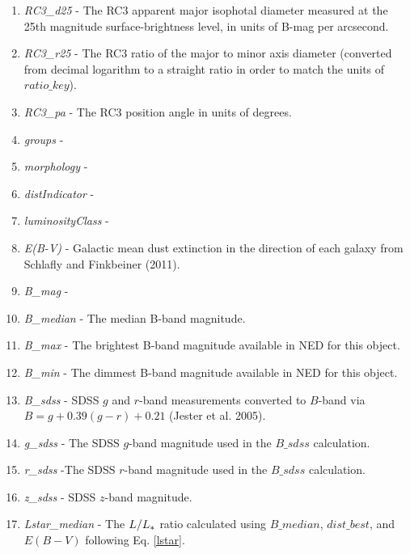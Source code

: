 \documentclass[iop]{emulateapj-rtx4}
\begin{document}
\begin{enumerate}
\item \textit{RC3\_d25} - The RC3 apparent major isophotal diameter measured at the 25th magnitude surface-brightness level, in units of B-mag per arcsecond.

\item \textit{RC3\_r25} - The RC3 ratio of the major to minor axis diameter (converted from decimal logarithm to a straight ratio in order to match the units of $ratio\_key$). 

\item \textit{RC3\_pa} - The RC3 position angle in units of degrees.

\item \textit{groups} - 

\item \textit{morphology} - 

\item \textit{distIndicator} - 

\item \textit{luminosityClass} - 

\item \textit{E(B-V)} - Galactic mean dust extinction in the direction of each galaxy from Schlafly and Finkbeiner (2011).

\item \textit{B\_mag} - 

\item \textit{B\_median} - The median B-band magnitude.

\item \textit{B\_max} - The brightest B-band magnitude available in NED for this object.

\item \textit{B\_min} - The dimmest B-band magnitude available in NED for this object.

\item \textit{B\_sdss} - SDSS $g$ and $r$-band measurements converted to $B$-band via $B = g + 0.39 (g-r) + 0.21$ (Jester et al. 2005).

\item \textit{g\_sdss} - The SDSS $g$-band magnitude used in the $B\_sdss$ calculation.

\item \textit{r\_sdss} -The SDSS $r$-band magnitude used in the $B\_sdss$ calculation.

\item \textit{z\_sdss} - SDSS $z$-band magnitude.

\item \textit{Lstar\_median} - The $L / L_{\**}$ ratio calculated using $B\_median$, $dist\_best$, and $E(B-V)$ following Eq. \ref{lstar}.


\end{enumerate}
\end{document}
